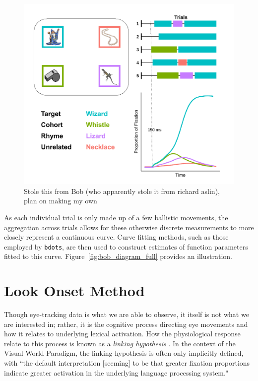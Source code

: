 \documentclass{article}
\newcommand{\xt}{\texttt}
\begin{document}
\begin{figure}[H]
\centering
\includegraphics[scale=0.7]{collin_diagram_full.pdf}
\caption{Stole this from Bob (who apparently stole it from richard aslin), plan on making my own}
\label{fig:collin_diagram_full}
\end{figure}



As each individual trial is only made up of a few ballistic movements, the aggregation across trials allows for these otherwise discrete measurements to more closely represent a continuous curve. Curve fitting methods, such as those employed by \xt{bdots}, are then used to construct estimates of function parameters fitted to this curve. Figure~\ref{fig:bob_diagram_full} provides an illustration.


\section{Look Onset Method}

Though eye-tracking data is what we are able to observe, it itself is not what we are interested in; rather, it is the cognitive process directing eye movements and how it relates to underlying lexical activation. How the physiological response relate to this process is known as a \textit{linking hypothesis} \cite{Magnuson2019}. In the context of the Visual World Paradigm, the linking hypothesis is often only implicitly defined, with ``the default interpretation [seeming] to be that greater fixation proportions indicate greater activation in the underlying language processing system." 
\end{document}
